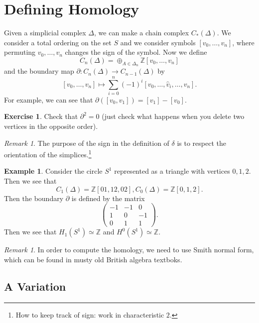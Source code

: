 \documentclass[leqno, openany]{memoir}
\theoremstyle{definition}
\newtheorem{exm}[thm]{Example}
\newtheorem{exer}[thm]{Exercise}
\theoremstyle{remark}
\newtheorem{rmk}[thm]{Remark}
\theoremstyle{plain}
\theoremstyle{definition}
\theoremstyle{remark}
\newcommand{\Z}{\mathbb{Z}}
\begin{document}
\section{Defining Homology}%
\label{sec:defining_homology}

Given a simplicial complex $\Delta$, we can make a chain complex $C_*(\Delta)$. We consider a total ordering on the set $S$ and we consider symbols $[v_0, \ldots, v_n]$, where permuting $v_0, \ldots, v_n$ changes the sign of the symbol. Now we define
\[ C_n(\Delta) = \oplus_{A \in \Delta_n} \Z [v_0, \ldots, v_n] \]
and the boundary map $\partial: C_n(\Delta) \to C_{n-1}(\Delta)$ by
\[ [v_0, \ldots, v_n] \mapsto \sum_{i=0}^n (-1)^i [v_0, \ldots, \widehat{v}_i, \ldots, v_n].\]
For example, we can see that $\partial([v_0, v_1]) = [v_1] - [v_0]$.

\begin{exer}
    Check that $\partial^2 = 0$ (just check what happens when you delete two vertices in the opposite order).
\end{exer}

\begin{rmk}
    The purpose of the sign in the definition of $\delta$ is to respect the orientation of the simplices.\footnote{How to keep track of sign: work in characteristic $2$.}
\end{rmk}

\begin{exm}
    Consider the circle $S^1$ represented as a triangle with vertices $0,1,2$. Then we see that
    \[ C_1(\Delta) = \Z[01,12,02], C_0(\Delta)=\Z[0,1,2].\]
    Then the boundary $\partial$ is defined by the matrix
    \[ \begin{pmatrix}
        -1 & -1 & 0 \\
        1 & 0 & -1 \\
        0 & 1 & 1 
    \end{pmatrix}. \]
    Then we see that $H_1(S^1) \simeq \Z$ and $H^0(S^1) \simeq \Z$.
\end{exm}

\begin{rmk}
    In order to compute the homology, we need to use Smith normal form, which can be found in musty old British algebra textboks.
\end{rmk}

\subsection{A Variation}%
\label{sec:a_variation}
\end{document}
